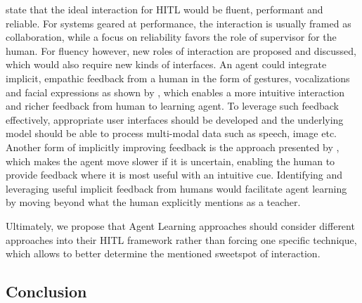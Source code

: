 \documentclass[twoside,11pt]{article}
\begin{document}
\begin{enumerate}
\citet{WuEtAl:2021:HITLMLSurvey} state that the ideal interaction for HITL would be fluent, performant and reliable. For systems geared at performance, the interaction is usually framed as collaboration, while a focus on reliability favors the role of supervisor for the human. For fluency however, new roles of interaction are proposed and discussed, which would also require new kinds of interfaces. An agent could integrate implicit, empathic feedback from a human in the form of gestures, vocalizations and facial expressions as shown by \citet{CuiEtAl:2020:EMPATHICFrameworkHumanFeedback}, which enables a more intuitive interaction and richer feedback from human to learning agent. To leverage such feedback effectively, appropriate user interfaces should be developed and the underlying model should be able to process multi-modal data such as speech, image etc. Another form of implicitly improving feedback is the approach presented by \citet{PengEtAl:2016:AdaptingAgentSpeed}, which makes the agent move slower if it is uncertain, enabling the human to provide feedback where it is most useful with an intuitive cue. Identifying and leveraging useful implicit feedback from humans would facilitate agent learning by moving beyond what the human explicitly mentions as a teacher.

Ultimately, we propose that Agent Learning approaches should consider different approaches into their HITL framework rather than forcing one specific technique, which allows to better determine the mentioned sweetspot of interaction.

\subsection{Conclusion}



\end{enumerate}
\end{document}
